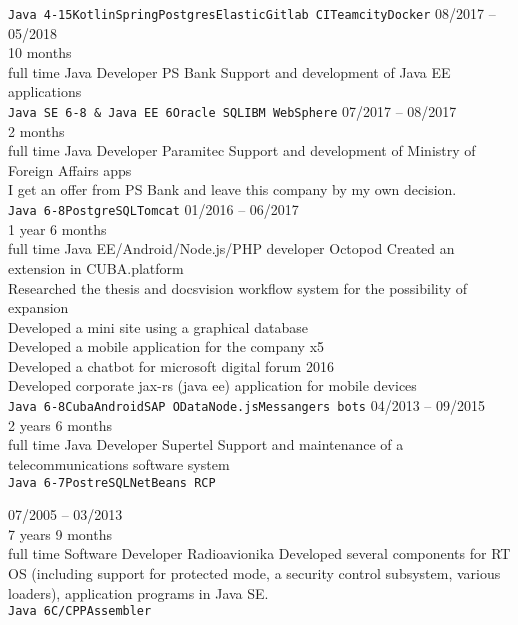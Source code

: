 \begin{entrylist}
{    \texttt{Java 4-15}\slashsep\texttt{Kotlin}\slashsep\texttt{Spring}\slashsep\texttt{Postgres}\slashsep\texttt{Elastic}\slashsep\texttt{Gitlab CI}\slashsep\texttt{Teamcity}\slashsep\texttt{Docker}}
    \entry
    {08/2017 -- 05/2018\\\footnotesize{10 months\\full time}}
    {Java Developer}
    {PS Bank}
    {
        Support and development of Java EE applications \\
        \texttt{Java SE 6-8 \& Java EE 6}\slashsep\texttt{Oracle SQL}\slashsep\texttt{IBM WebSphere}}
    \entry
    {07/2017 -- 08/2017\\\footnotesize{2 months\\full time}}
    {Java Developer}
    {Paramitec}
    {
        Support and development of Ministry of Foreign Affairs apps \\
        I get an offer from PS Bank and leave this company by my own decision. \\
        \texttt{Java 6-8}\slashsep\texttt{PostgreSQL}\slashsep\texttt{Tomcat}}
    \entry
    {01/2016 -- 06/2017\\\footnotesize{1 year 6 months\\full time}}
    {Java EE/Android/Node.js/PHP developer}
    {Octopod}
    {
        Created an extension in CUBA.platform \\
        Researched the thesis and docsvision workflow system for the possibility of expansion \\
        Developed a mini site using a graphical database \\
        Developed a mobile application for the company x5 \\
        Developed a chatbot for microsoft digital forum 2016 \\
        Developed corporate jax-rs (java ee) application for mobile devices\\
    \texttt{Java 6-8}\slashsep\texttt{Cuba}\slashsep\texttt{Android}\slashsep\texttt{SAP OData}\slashsep\texttt{Node.js}\slashsep\texttt{Messangers bots}}
    \entry
    {04/2013 -- 09/2015\\\footnotesize{2 years 6 months\\full time}}
    {Java Developer}
    {Supertel}
    {
        Support and maintenance of a telecommunications software system \\
        \texttt{Java 6-7}\slashsep\texttt{PostreSQL}\slashsep\texttt{NetBeans RCP}}

    \entry
    {07/2005 -- 03/2013\\\footnotesize{7 years 9 months\\full time}}
    {Software Developer}
    {Radioavionika}
    {
        Developed several components for RT OS (including support for protected mode, a security control subsystem, various loaders), application programs in Java SE. \\
    \texttt{Java 6}\slashsep\texttt{C/CPP}\slashsep\texttt{Assembler}}

\end{entrylist}

